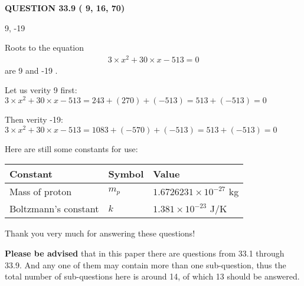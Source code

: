\documentclass[12pt]{article}
\begin{document}
 
 
  
\vspace{0.2in}
  
{\textbf{\Large{QUESTION
33.9 
 (          9,         16,         70)
}}}
  
  


 
 
\noindent{}

9,  %
-19
 
 
 
 
 
\noindent{}

Roots to the equation
\begin{eqnarray*}
3 \times x^2  %
+  %
30
                 \times x    %
-513 =0
\end{eqnarray*}
are  %
9 and  %
-19 .
 
Let us verity  %
9 first:
$  %
3 \times x^2  %
+  %
30
                 \times x    %
-513
  = %
243+( %
270)+( %
-513)
  = %
513+( %
-513)
  = %
0
$
 
Then verity  %
-19:
$  %
3 \times x^2  %
+  %
30
                 \times x    %
-513
  = %
1083+( %
-570)+( %
-513)
  = %
513+( %
-513)
  = %
0
$
 
 
 
   
   
 \vspace{0.2in}
Here are still some constants for use:
 
 
\noindent\begin{tabular}{|l|l|l|}
\hline
Constant & Symbol & Value \\
\hline
 
Mass of proton &
$m_p$ &
 $ 1.6726231 \times 10^{-27} $
kg \\
\hline
 
Boltzmann's constant &
$k$ &
 $ 1.381 \times 10^{-23} $
J/K \\
\hline
 
\end{tabular}
 
Thank you very much for answering these questions!
 
{\textbf{\large{Please be advised}}} that in this paper there are questions from
33.1 through
33.9.
And any one of them may contain more than one sub-question, thus the total number
of sub-questions here is around 14, of which
13 should be answered.
 
\end{document}
